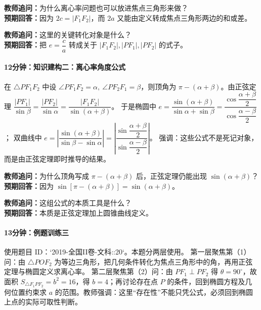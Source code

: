 \documentclass[UTF8,a4paper,11pt]{ctexart}
\begin{document}
\noindent\textbf{教师追问：}为什么离心率问题也可以放进焦点三角形来做？\\

\textbf{预期回答：}因为 $2c=|F_1F_2|$，而 $2a$ 又能由定义转成焦点三角形两边的和或差。\par

\noindent\textbf{教师追问：}这里的关键转化对象是什么？\\

\textbf{预期回答：}把 $e=\dfrac ca$ 转成关于 $|F_1F_2|,|PF_1|,|PF_2|$ 的式子。\par

\paragraph{12分钟：知识建构二：离心率角度公式}

在 $\triangle PF_1F_2$ 中设 $\angle PF_1F_2=\alpha,\ \angle PF_2F_1=\beta$，则顶角为 $\pi-(\alpha+\beta)$。由正弦定理
$\dfrac{|PF_1|}{\sin\beta}=\dfrac{|PF_2|}{\sin\alpha}=\dfrac{|F_1F_2|}{\sin(\alpha+\beta)}$。
于是椭圆中
$e=\dfrac{\sin(\alpha+\beta)}{\sin\alpha+\sin\beta}=\dfrac{\cos\dfrac{\alpha+\beta}{2}}{\cos\dfrac{\alpha-\beta}{2}}$；
双曲线中
$e=\left|\dfrac{\sin(\alpha+\beta)}{\sin\beta-\sin\alpha}\right|=\left|\dfrac{\sin\dfrac{\alpha+\beta}{2}}{\sin\dfrac{\alpha-\beta}{2}}\right|$。
强调：这些公式不是死记对象，而是由正弦定理即时推导的结果。

\noindent\textbf{教师追问：}为什么顶角写成 $\pi-(\alpha+\beta)$ 后，正弦定理仍能出现 $\sin(\alpha+\beta)$？\\

\textbf{预期回答：}因为 $\sin[\pi-(\alpha+\beta)]=\sin(\alpha+\beta)$。\par

\noindent\textbf{教师追问：}这组公式的本质工具是什么？\\

\textbf{预期回答：}本质是正弦定理加上圆锥曲线定义。\par

\paragraph{13分钟：例题训练三}

使用题目 ID：`2019-全国II卷-文科::20`。本题分两层使用。
第一层聚焦第（1）问：由 $\triangle POF_2$ 为等边三角形，把几何条件转化为焦点三角形中的角，再用正弦定理与椭圆定义求离心率。
第二层聚焦第（2）问：由 $PF_1\perp PF_2$ 得 $\theta=90^\circ$，故面积 $S_{\triangle F_1PF_2}=b^2=16$，得 $b=4$；再讨论存在点 $P$ 的条件，回到椭圆方程及几何位置约束求 $a$ 的范围。教师强调：这里“存在性”不能只凭公式，必须回到椭圆上点的实际可取性判断。
\end{document}
